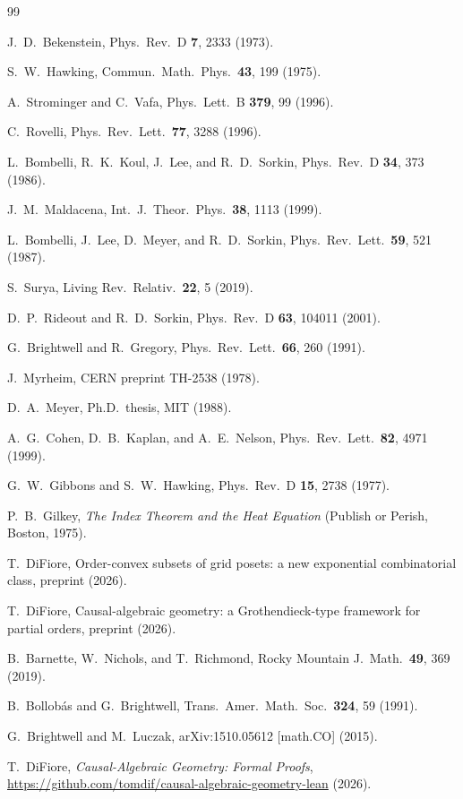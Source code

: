 \documentclass[aps,prl,twocolumn,superscriptaddress]{revtex4-2}
\begin{document}
\begin{thebibliography}{99}

J.~D.~Bekenstein,
Phys.\ Rev.\ D \textbf{7}, 2333 (1973).

S.~W.~Hawking,
Commun.\ Math.\ Phys.\ \textbf{43}, 199 (1975).

A.~Strominger and C.~Vafa,
Phys.\ Lett.\ B \textbf{379}, 99 (1996).

C.~Rovelli,
Phys.\ Rev.\ Lett.\ \textbf{77}, 3288 (1996).

L.~Bombelli, R.~K.~Koul, J.~Lee, and R.~D.~Sorkin,
Phys.\ Rev.\ D \textbf{34}, 373 (1986).

J.~M.~Maldacena,
Int.\ J.\ Theor.\ Phys.\ \textbf{38}, 1113 (1999).

L.~Bombelli, J.~Lee, D.~Meyer, and R.~D.~Sorkin,
Phys.\ Rev.\ Lett.\ \textbf{59}, 521 (1987).

S.~Surya,
Living Rev.\ Relativ.\ \textbf{22}, 5 (2019).

D.~P.~Rideout and R.~D.~Sorkin,
Phys.\ Rev.\ D \textbf{63}, 104011 (2001).

G.~Brightwell and R.~Gregory,
Phys.\ Rev.\ Lett.\ \textbf{66}, 260 (1991).

J.~Myrheim,
CERN preprint TH-2538 (1978).

D.~A.~Meyer,
Ph.D.\ thesis, MIT (1988).

A.~G.~Cohen, D.~B.~Kaplan, and A.~E.~Nelson,
Phys.\ Rev.\ Lett.\ \textbf{82}, 4971 (1999).

G.~W.~Gibbons and S.~W.~Hawking,
Phys.\ Rev.\ D \textbf{15}, 2738 (1977).

P.~B.~Gilkey,
\emph{The Index Theorem and the Heat Equation}
(Publish or Perish, Boston, 1975).

T.~DiFiore,
Order-convex subsets of grid posets: a new exponential
combinatorial class, preprint (2026).

T.~DiFiore,
Causal-algebraic geometry: a Grothendieck-type framework for
partial orders, preprint (2026).

B.~Barnette, W.~Nichols, and T.~Richmond,
Rocky Mountain J.\ Math.\ \textbf{49}, 369 (2019).

B.~Bollob\'as and G.~Brightwell,
Trans.\ Amer.\ Math.\ Soc.\ \textbf{324}, 59 (1991).

G.~Brightwell and M.~Luczak,
arXiv:1510.05612 [math.CO] (2015).

T.~DiFiore,
\emph{Causal-Algebraic Geometry: Formal Proofs},
\url{https://github.com/tomdif/causal-algebraic-geometry-lean} (2026).

\end{thebibliography}
\end{document}

